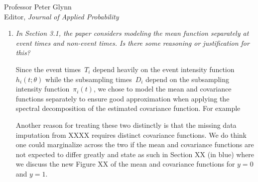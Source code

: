 \documentclass[11pt]{letter} %
\begin{document}
\begin{letter}{Professor
	Peter Glynn\\
	Editor, {\em Journal of Applied Probability}}
\begin{enumerate}
\vspace{5mm}
We have decided that the point we were trying to raise is non-essential to the current manuscript, so we have removed the discussion of \emph{independent evolution} and its implication that $\varepsilon (t) = 0$ for all $t >0$.  The key issue we were trying to clarify is that the traditional joint model formulation in which the observed health process and time-to-event are conditionally independent given the latent process implies that the hazard function conditional on the entire observed health process depends on values after the current time.  In the case study, for example, this implies that the expected risk of a button press given the entire sensor process will depend on future activity index and electrodermal activity.  This holds unless we assume the measurement error is set to zero.  The referee is correct that we will only compute conditional probabilities given the historical functional predictor; however, the likelihood factorization means that we implicitly are defining a conditional intensity given the entire functional predictor and the traditional approach has this undesirable dependence. While the author still thinks it an important point that he wishes was more well appreciated in the joint modeling literature, the current paper has enough content for this discussion to be omitted.  Moreover, the empirical impact seems to be limited and therefore it is better to make this point in a different manuscript and case study.
\vspace{5mm}


\item {\it In Section 3.1, the paper considers modeling the mean function separately at event times and non-event times. Is there some reasoning or justification for this?}

\vspace{5mm}
Since the event times~$T_i$ depend heavily on the event intensity function~$h_i (t;\theta)$ while the subsampling times~$D_i$ depend on the subsampling intensity function~$\pi_i(t)$, we chose to model the mean and covariance functions separately to ensure good approximation when applying the spectral decomposition of the estimated covariance function.  For example
\vspace{5mm}

Another reason for treating these two distinctly is that the missing data imputation from XXXX requires distinct covariance functions.  We do think one could marginalize across the two if the mean and covariance functions are not expected to differ greatly and state as such in Section XX (in blue) where we discuss the new Figure XX of the mean and covariance functions for $y=0$ and $y=1$.
\vspace{5mm}


\end{enumerate}
\end{letter}
\end{document}
